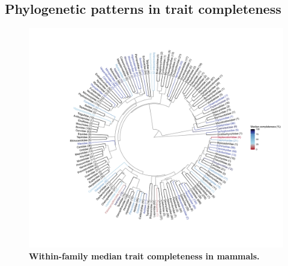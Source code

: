 \begin{landscape}

\section{Phylogenetic patterns in trait completeness}


\begin{figure}[h!]
\centering
\includegraphics[scale=0.63, clip, trim=100 60 0 60]{Supporting/Chapter2/Figures/Phylogenies/Circular_mammals_V2}
\caption[Within-family median trait completeness in mammals]{\textbf{Within-family median trait completeness in mammals.}}
\label{}
\end{figure}

\newpage
\pagebreak
\vspace{-3cm}


\end{landscape}

